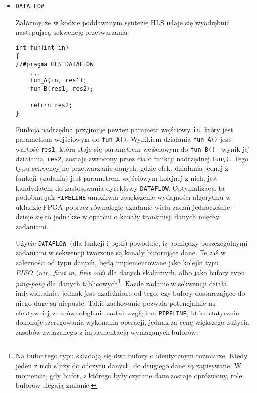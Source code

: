 \begin{itemize}
\item \texttt{DATAFLOW}

Załóżmy, że w kodzie poddawanym syntezie HLS udaje się wyodrębnić następującą sekwencję przetwarzania:
\begin{lstlisting}[caption=Blok kodu mogący zostać poddany optymalizacji DATAFLOW]
int fun(int in)
{
//#pragma HLS DATAFLOW
	...
	fun_A(in, res1);
	fun_B(res1, res2);
	
	return res2;
}
\end{lstlisting}
Funkcja nadrzędna przyjmuje pewien parametr wejściowy \texttt{in}, który jest parametrem wejściowym do \texttt{fun\_A()}. Wynikiem działania \texttt{fun\_A()} jest wartość \texttt{res1}, która staje się parametrem wejściowym do \texttt{fun\_B()} - wynik jej działania, \texttt{res2},  zostaje zwrócony przez ciało funkcji nadrzędnej \texttt{fun()}. Tego typu sekwencyjne przetwarzanie danych, gdzie efekt działania jednej z funkcji~(zadania) jest parametrem wejściowym kolejnej z nich, jest kandydatem do zastosowania dyrektywy \texttt{DATAFLOW}. Optymalizacja ta podobnie jak \texttt{PIPELINE} umożliwia zwiększenie wydajności algorytmu w układzie FPGA poprzez równoległe działanie wielu zadań jednocześnie - dzieje się to jednakże w oparciu o kanały transmisji danych między zadaniami.

Użycie \texttt{DATAFLOW}~(dla funkcji i pętli) powoduje, iż pomiędzy poszczególnymi zadaniami w sekwencji tworzone są kanały buforujące dane. Te zaś w zależności od typu danych, będą implementowane jako kolejki typu \textit{FIFO}~(ang. \textit{first in, first out}) dla danych skalarnych, albo jako bufory typu \textit{ping-pong} dla danych tablicowych\footnote{Na bufor tego typu składają się dwa bufory o identycznym rozmiarze. Kiedy jeden z nich służy do odczytu danych, do drugiego dane są zapisywane. W momencie, gdy bufor, z którego były czytane dane zostaje opróżniony, role buforów ulegają zmianie.}. Każde zadanie w sekwencji działa indywidualnie, jednak jest uzależnione od tego, czy bufory dostarczające do niego dane są niepuste. Takie zachowanie pozwala potencjalnie na efektywniejsze zrównoleglenie zadań względem \texttt{PIPELINE}, które statycznie dokonuje szeregowania wykonania operacji, jednak za cenę większego zużycia zasobów związanego z implementacją wymaganych buforów. 



\end{itemize}
